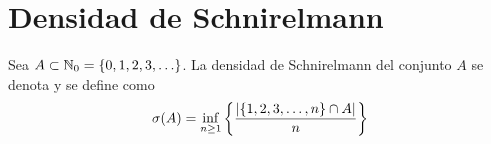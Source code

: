 \section{Densidad de Schnirelmann}
Sea $A\subset \mathbb{N}_0 = \left\{0,1,2,3,\ldots\right\}$. La densidad de Schnirelmann del conjunto $A$ se denota y se define como 
\begin{equation}
    \sigma(A) = \inf_{n\geq 1} \left\{\frac{\left\lvert\left\{1,2,3,\ldots,n\right\}\cap A\right\rvert}{n}\right\}
\end{equation}

